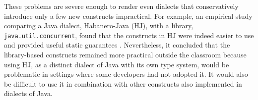 \documentclass{sigplanconf}
\newcommand{\lip}[1]{\lstinline[language=Python,basicstyle=\ttfamily\small,deletendkeywords={tuple,buffer,map}]{#1}}
\begin{document}
These problems are severe enough to render even dialects that conservatively introduce only a few new constructs impractical. For example, an empirical study comparing a Java dialect, Habanero-Java (HJ), with a library, \lip{java.util.concurrent}, found that the constructs in HJ were indeed easier to use and provided useful static guarantees \cite{cave2010comparing}. Nevertheless, it concluded that the library-based constructs remained more practical outside the classroom because using HJ, as a distinct dialect of Java with its own type system, would be problematic in settings where some developers had not adopted it. It would also be difficult to use it in combination with other constructs also implemented in dialects of Java. %


\end{document}
